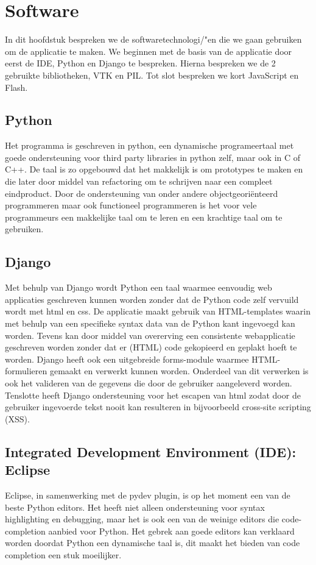 \section{Software}
\label{Software}
In dit hoofdstuk bespreken we de softwaretechnologi/"{e}n die we gaan gebruiken om de applicatie te maken.
We beginnen met de basis van de applicatie door eerst de IDE, Python en Django te bespreken.
Hierna bespreken we de 2 gebruikte bibliotheken, VTK en PIL.
Tot slot bespreken we kort JavaScript en Flash.

\subsection{Python}
Het programma is geschreven in python, een dynamische programeertaal met goede ondersteuning voor third party libraries in python zelf, maar ook in C of C++. De taal is zo opgebouwd dat het makkelijk is om prototypes te maken en die later door middel van refactoring om te schrijven naar een compleet eindproduct. Door de ondersteuning van onder andere objectgeori\"{e}nteerd programmeren maar ook functioneel programmeren is het voor vele programmeurs een makkelijke taal om te leren en een krachtige taal om te gebruiken.

\subsection{Django}
Met behulp van Django wordt Python een taal waarmee eenvoudig web applicaties geschreven kunnen worden zonder dat de Python code zelf vervuild wordt met html en css. De applicatie maakt gebruik van HTML-templates waarin met behulp van een specifieke syntax data van de Python kant ingevoegd kan worden. Tevens kan door middel van overerving een consistente webapplicatie geschreven worden zonder dat er (HTML) code gekopieerd en geplakt hoeft te worden. Django heeft ook een uitgebreide forms-module waarmee HTML-formulieren gemaakt en verwerkt kunnen worden. Onderdeel van dit verwerken is ook het valideren van de gegevens die door de gebruiker aangeleverd worden. Tenslotte heeft Django ondersteuning voor het escapen van html zodat door de gebruiker ingevoerde tekst nooit kan resulteren in bijvoorbeeld cross-site scripting (XSS).

\subsection{Integrated Development Environment (IDE): Eclipse}
Eclipse, in samenwerking met de pydev plugin, is op het moment een van de beste Python editors. Het heeft niet alleen ondersteuning voor syntax highlighting en debugging, maar het is ook een van de weinige editors die code-completion aanbied voor Python. Het gebrek aan goede editors kan verklaard worden doordat Python een dynamische taal is, dit maakt het bieden van code completion een stuk moeilijker.


